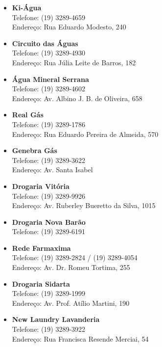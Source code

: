 \begin{itemize}
\item  \textbf{Ki-Água}
		\\Telefone: (19) 3289-4659
		\\Endereço: Rua Eduardo Modesto, 240

\item  \textbf{Circuito das Águas}
		\\Telefone: (19) 3289-4930
		\\Endereço: Rua Júlia Leite de Barros, 182

\item  \textbf{Água Mineral Serrana}
		\\Telefone: (19) 3289-4602
		\\Endereço: Av. Albino J. B. de Oliveira, 658

\item  \textbf{Real Gás}
		\\Telefone: (19) 3289-1786
		\\Endereço: Rua Eduardo Pereira de Almeida, 570

\item  \textbf{Genebra Gás}
		\\Telefone: (19) 3289-3622
		\\Endereço: Av. Santa Isabel

\item  \textbf{Drogaria Vitória}
		\\Telefone: (19) 3289-9926
		\\Endereço: Av. Ruberley Bueretto da Silva, 1015

\item  \textbf{Drogaria Nova Barão}
		\\Telefone: (19) 3289-6191

\item  \textbf{Rede Farmaxima}
		\\Telefone: (19) 3289-2824 / (19) 3289-4054
		\\Endereço: Av. Dr. Romeu Tortima, 255

\item  \textbf{Drogaria Sidarta}
		\\Telefone: (19) 3289-1999
		\\Endereço: Av. Prof. Atílio Martini, 190

\item  \textbf{New Laundry Lavanderia}
		\\Telefone: (19) 3289-3922
		\\Endereço: Rua Francisca Resende Merciai, 54


\end{itemize}
